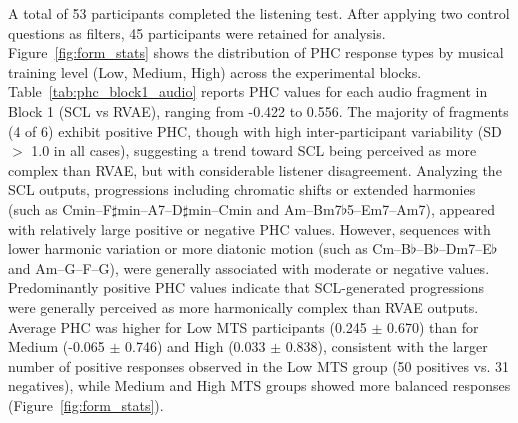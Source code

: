 \documentclass[conference]{IEEEtran}
\begin{document}
A total of 53 participants completed the listening test. After applying two control questions as filters, 45 participants were retained for analysis. Figure~\ref{fig:form_stats} shows the distribution of PHC response types by musical training level (Low, Medium, High) across the experimental blocks.
Table~\ref{tab:phc_block1_audio} reports PHC values for each audio fragment in Block 1 (SCL vs RVAE), ranging from -0.422 to 0.556. The majority of fragments (4 of 6) exhibit positive PHC, though with high inter-participant variability (SD $>$ 1.0 in all cases), suggesting a trend toward SCL being perceived as more complex than RVAE, but with considerable listener disagreement. 
Analyzing the SCL outputs, progressions including chromatic shifts or extended harmonies (such as Cmin–F$\sharp$min–A7–D$\sharp$min–Cmin and Am–Bm7$\flat$5–Em7–Am7), appeared with relatively large positive or negative PHC values. However, sequences with lower harmonic variation or more diatonic motion (such as Cm–B$\flat$–B$\flat$–Dm7–E$\flat$ and Am–G–F–G), were generally associated with moderate or negative values.
Predominantly positive PHC values indicate that SCL-generated progressions were generally perceived as more harmonically complex than RVAE outputs.
Average PHC was higher for Low MTS participants (0.245 $\pm$ 0.670) than for Medium (-0.065 $\pm$ 0.746) and High (0.033 $\pm$ 0.838), consistent with the larger number of positive responses observed in the Low MTS group (50 positives vs. 31 negatives), while Medium and High MTS groups showed more balanced responses (Figure~\ref{fig:form_stats}).

\begin{table}[t]
\centering
\caption{PHC values per audio fragment in Block 1 with corresponding SCL-generated chord progressions.}
\label{tab:phc_block1_audio}
\end{table}
\end{document}
